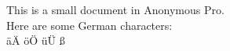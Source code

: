 \documentclass{article}
\begin{document}
This is a small document in Anonymous Pro.
\\
Here are some German characters:
\\
äÄ öÖ üÜ ß
\end{document}
